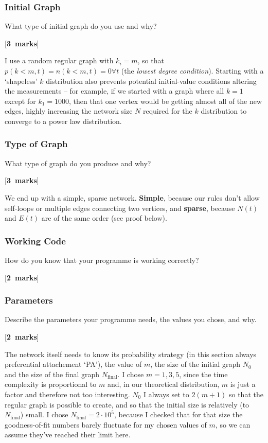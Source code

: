 \documentclass[a4paper,12pt]{article}
\newcounter{nmarks}
\newcommand{\qmarks}[1]{\addtocounter{nmarks}{#1} }
\renewcommand{\qmarks}[1]{\addtocounter{nmarks}{#1} \hspace*{\fill} [\textbf{#1~marks}]}
\begin{document}
\subsubsection{Initial Graph}
What type of initial graph do you use and why? \qmarks{3}

I use a random regular graph with $k_i=m$, so that $p(k<m,t)=n(k<m,t)=0\forall t$ (the \textit{lowest degree condition}). Starting with a `shapeless' $k$ distribution also prevents potential initial-value conditions altering the measurements -- for example, if we started with a graph where all $k=1$ except for $k_1=1000$, then that one vertex would be getting almost all of the new edges, highly increasing the network size $N$ required for the $k$ distribution to converge to a power law distribution.

\subsubsection{Type of Graph}
What type of graph do you produce and why? \qmarks{3}

We end up with a simple, sparse network. \textbf{Simple}, because our rules don't allow self-loops or multiple edges connecting two vertices, and \textbf{sparse}, because $N(t)$ and $E(t)$ are of the same order (see proof below).

\subsubsection{Working Code}
How do you know that your programme is working correctly? \qmarks{2}


\subsubsection{Parameters}
Describe the parameters your programme needs, the values you chose, and why. \qmarks{2}

The network itself needs to know its probability strategy (in this section always preferential attachement `PA'), the value of $m$, the size of the initial graph $N_0$ and the size of the final graph $N_{\mathrm{final}}$. I chose $m=1, 3, 5$, since the time complexity is proportional to $m$ and, in our theoretical distribution, $m$ is just a factor and therefore not too interesting. $N_0$ I always set to $2(m+1)$ so that the regular graph is possible to create, and so that the initial size is relatively (to $N_{\mathrm{final}}$) small. I chose $N_{\mathrm{final}} = 2\cdot 10^5$, because I checked that for that size the goodness-of-fit numbers barely fluctuate for my chosen values of $m$, so we can assume they've reached their limit here.
\end{document}
